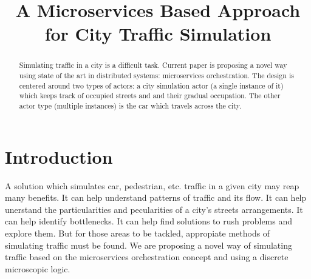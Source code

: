 \documentclass[conference]{IEEEtran}
\begin{document}
\title{A Microservices Based Approach for City Traffic Simulation}

\author{
    \and
}

\maketitle

\begin{abstract}

Simulating traffic in a city is a difficult task. Current paper is proposing a novel way using state of the art in distributed systems: microservices orchestration. The design is centered around two types of actors: a city simulation actor (a single instance of it) which keeps track of occupied streets and and their gradual occupation. The other actor type (multiple instances) is the car which travels across the city.

\end{abstract}

\section{Introduction}

A solution which simulates car, pedestrian, etc. traffic in a given city may reap many benefits. It can help understand patterns of traffic and its flow. It can help unerstand the particularities and pecularities of a city's streets arrangements. It can help identify bottlenecks. It can help find solutions to rush problems and explore them. But for those areas to be tackled, appropiate methods of simulating traffic must be found. We are proposing a novel way of simulating traffic based on the microservices orchestration concept and using a discrete microscopic logic.
\end{document}

